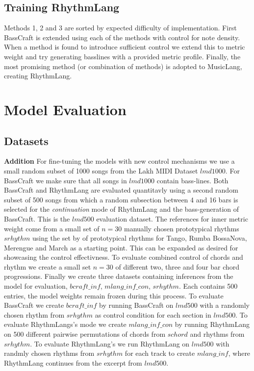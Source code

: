 \subsection{Training RhythmLang}
Methods 1, 2 and 3 are sorted by expected difficulty of implementation. First BassCraft is extended using each of the methods with control for note density. When a method is found to introduce sufficient control we extend this to metric weight and try generating basslines with a provided metric profile. Finally, the most promising method (or combination of methods) is adopted to MusicLang, creating RhythmLang.

\section{Model Evaluation}
\subsection{Datasets}
\textbf{Addition} For fine-tuning the models with new control mechanisms we use a small random subset of 1000 songs from the Lakh MIDI Dataset $lmd1000$. For BassCraft we make sure that all songs in $lmd1000$ contain bass-lines. Both BassCraft and RhythmLang are evaluated quantitavly using a second random subset of 500 songs from which a random subsection between 4 and 16 bars is selected for the \textit{continuation} mode of RhythmLang and the bass-generation of BassCraft. This is the $lmd500$ evaluation dataset. The references for inner metric weight come from a small set of $n=30$ manually chosen prototypical rhythms $srhythm$ using the set by \cite{Chew_Volk_Lee_Dance_metric_weight_2005} of prototypical rhythms for Tango, Rumba BossaNova, Merengue and March as a starting point. This can be expanded as desired for showcasing the control effectivness.
To evaluate combined control of chords and rhythm we create a small set $n=30$ of different two, three and four bar chord progressions.
Finally we create three datasets containing inferences from the model for evaluation, $bcraft\_inf$,  $mlang\_inf\_con$, $srhythm$. Each contains 500 entries, the model weights remain frozen during this process.  
To evaluate BassCraft we create $bcraft\_inf$ by running BassCraft on $lmd500$ with a randomly chosen rhythm from $srhythm$ as control condition for each section in $lmd500$. 
To evaluate RhythmLangs's  mode we create $mlang\_inf\_con$ by running RhythmLang on 500 different pairwise permutations of chords from $schord$ and rhythms from $srhythm$. 
To evaluate RhythmLang's  we run RhythmLang on $lmd500$ with randmly chosen rhythms from $srhythm$ for each track to create $mlang\_inf$, where RhythmLang continues from the excerpt from $lmd500$.  


